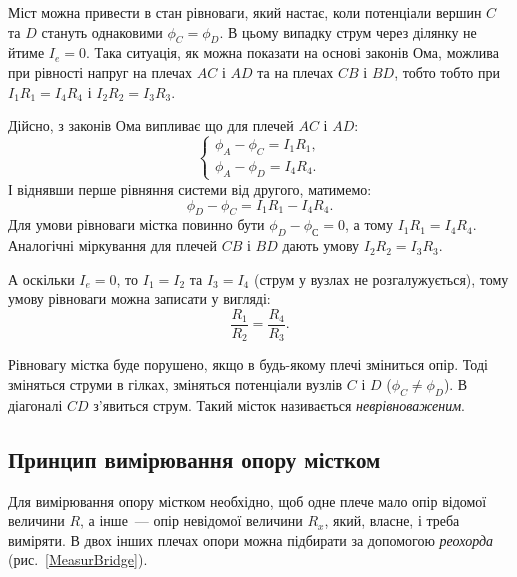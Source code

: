 \documentclass{LabWork}
\begin{document}
Міст можна привести в стан рівноваги, який настає, коли потенціали вершин $C$ та $D$ стануть однаковими $\phi_C = \phi_D$. В цьому випадку струм через ділянку не йтиме $I_e = 0$. Така ситуація, як можна показати на основі законів Ома, можлива при рівності напруг на плечах $AC$ і $AD$ та на плечах $CB$ і $BD$, тобто тобто при $I_1R_1 = I_4R_4$ і $I_2R_2 = I_3R_3$. 

\begin{More}
    Дійсно, з законів Ома випливає що для плечей $AC$ і $AD$:
    \begin{equation}\label{}
        \begin{cases}
            \phi_A - \phi_C = I_1R_1, \\
            \phi_A - \phi_D = I_4R_4.
        \end{cases}
    \end{equation} 
І віднявши перше рівняння системи від другого, матимемо:
    \begin{equation}\label{}
        \phi_D - \phi_C = I_1R_1 - I_4R_4.
    \end{equation}
Для умови рівноваги містка повинно бути $\phi_D - \phi_С = 0$, а тому $I_1R_1 = I_4R_4$. Аналогічні міркування для плечей $CB$ і $BD$ дають умову $I_2R_2 = I_3R_3$.
\end{More}

А оскільки $I_e = 0$, то $I_1 = I_2$ та $I_3 = I_4$ (струм у вузлах не розгалужується), тому умову рівноваги можна записати у вигляді:
\begin{equation}\label{BridgeEquality}
	\frac{R_1}{R_2} = \frac{R_4}{R_3}.
\end{equation}

Рівновагу містка буде порушено, якщо в будь-якому плечі зміниться опір. Тоді зміняться струми в гілках, зміняться потенціали вузлів $C$ і $D$ ($\phi_C \neq \phi_D$). В діагоналі $CD$ з'явиться струм. Такий місток називається \emph{неврівноваженим}.

\subsection{Принцип вимірювання опору містком}

Для вимірювання опору містком необхідно, щоб одне плече мало опір відомої величини $R$, а інше~--- опір невідомої величини $R_x$, який, власне, і треба виміряти. В двох інших плечах опори можна підбирати за допомогою \emph{реохорда} (рис.~\ref{MeasurBridge}).
\end{document}
